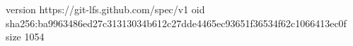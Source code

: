 version https://git-lfs.github.com/spec/v1
oid sha256:ba9963486ed27c31313034b612c27dde4465ec93651f36534f62c1066413ec0f
size 1054
